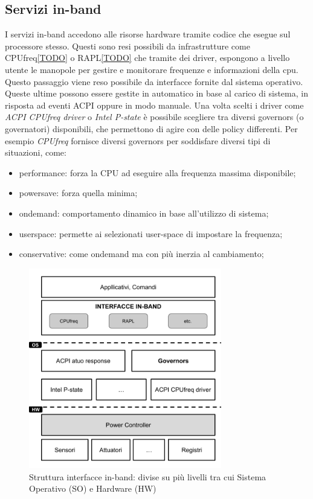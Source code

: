 
\subsection{Servizi in-band} %

I servizi in-band accedono alle risorse hardware tramite codice che esegue sul processore stesso. Questi sono resi possibili da infrastrutture come CPUfreq\ref{TODO} o RAPL\ref{TODO} che tramite dei driver, espongono a livello utente le manopole per gestire e monitorare frequenze e informazioni della cpu. Questo passaggio viene reso possibile da interfacce fornite dal sistema operativo. Queste ultime possono essere gestite in automatico in base al carico di sistema, in risposta ad eventi ACPI oppure in modo manuale. Una volta scelti i driver come \emph{ACPI CPUfreq driver} o \emph{Intel P-state} è possibile scegliere tra diversi governors (o governatori) disponibili, che permettono di agire con delle policy differenti.
Per esempio \emph{CPUfreq} fornisce diversi governors per soddisfare diversi tipi di situazioni, come:
\begin{itemize}
    \item performance: forza la CPU ad eseguire alla frequenza massima disponibile;
    \item powersave: forza quella minima;
    \item ondemand: comportamento dinamico in base all'utilizzo di sistema;
    \item userspace: permette ai selezionati user-space di impostare la frequenza; 
    \item conservative: come ondemand ma con più inerzia al cambiamento;
\end{itemize}

\begin{figure}[H]
    \centering
    \includegraphics[width=0.75\textwidth]{img/in-band.png}
    \caption{Struttura interfacce in-band: divise su più livelli tra cui Sistema Operativo (SO) e Hardware (HW) } 
    \label{fig:inband}
\end{figure}

